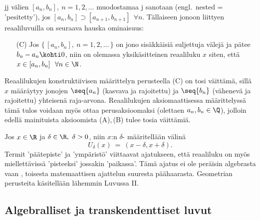 jj välien $[a_n, b_n],\ n =1,2, \ldots$ muodostamaa j
sanotaan  (engl.\ nested = 'pesitetty'), jos 
$[a_n, b_n] \supset [a_{n+1}, b_{n+1}]\ \ \forall n$. Tällaiseen jonoon liittyen reaaliluvuilla 
on seuraava hauska ominaisuus:
\begin{itemize}
\item[(C)] Jos $\{\,[a_n, b_n],\ n = 1,2, \ldots\,\}$ on jono sisäkkäisiä suljettuja välejä ja
           pätee $b_n - a_n \kohti 0$, niin on olemassa yksikäsitteinen reaaliluku $x$ siten, 
           että $x \in [a_n, b_n]\ \ \forall n \in \N$.
\end{itemize}
Reaalilukujen konstruktiivisen määrittelyn perusteella (C) on tosi väittämä, sillä $x$ määräytyy
jonojen $\seq{a_n}$ (kasvava ja rajoitettu) ja $\seq{b_n}$ (vähenevä ja rajoitettu) yhteisenä 
raja-arvona. Reaalilukujen aksiomaattisessa määrittelyssä tämä tulos voidaan myös ottaa 
perusaksioomaksi (olettaen $a_n,b_n\in\Q$), jolloin edellä mainituista aksioomista (A),\,(B) 
tulee tosia väittämiä.

Jos $x \in \R$ ja $\delta\in\R,\ \delta > 0$, niin $x$:n 
%
$\delta$- määritellään  välinä
\[
U_{\delta}(x)\ =\ (x-\delta,x+\delta).
\]
Termit 'päätepiste' ja 'ympäristö' viittaavat ajatukseen, että reaaliluku on myös miellettävissä
'pisteeksi' jossakin 'paikassa'. Tämä ajatus ei ole peräisin algebrasta vaan ,
toisesta matemaattisen ajattelun suuresta päähaarasta. Geometrian perusteita käsitellään 
lähemmin Luvussa II.

\subsection*{Algebralliset ja transkendenttiset luvut}

